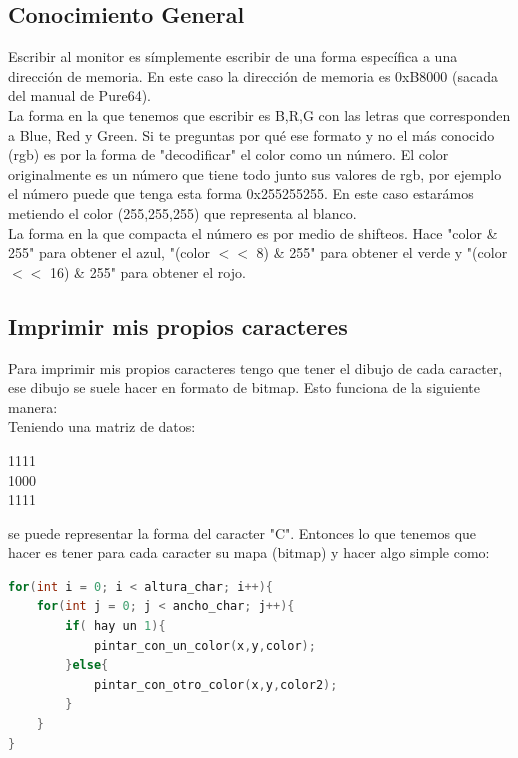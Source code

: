 \documentclass[]{article}
\begin{document}
\subsection*{Conocimiento General}

Escribir al monitor es s\'implemente escribir de una forma espec\'ifica a una direcci\'on de memoria. En este caso la direcci\'on de memoria es 0xB8000 (sacada del manual de Pure64).\\

La forma en la que tenemos que escribir es B,R,G con las letras que corresponden a Blue, Red y Green. Si te preguntas por qu\'e ese formato y no el m\'as conocido (rgb) es por la forma de "decodificar" el color como un n\'umero. El color originalmente es un n\'umero que tiene todo junto sus valores de rgb, por ejemplo el n\'umero puede que tenga esta forma 0x255255255. En este caso estar\'amos metiendo el color (255,255,255) que representa al blanco.\\

La forma en la que compacta el n\'umero es por medio de shifteos. Hace "color \& 255" para obtener el azul, "(color $<<$ 8) \& 255" para obtener el verde y "(color $<<$ 16) \& 255" para obtener el rojo.

\subsection*{Imprimir mis propios caracteres}
Para imprimir mis propios caracteres tengo que tener el dibujo de cada caracter, ese dibujo se suele hacer en formato de bitmap. Esto funciona de la siguiente manera: \\

Teniendo una matriz de datos:\\
\begin{center}
1111\\
1000\\
1111\\
\end{center}

se puede representar la forma del caracter "C". Entonces lo que tenemos que hacer es tener para cada caracter su mapa (bitmap) y hacer algo simple como:\\

\begin{lstlisting}[language=C]
for(int i = 0; i < altura_char; i++){
	for(int j = 0; j < ancho_char; j++){
		if( hay un 1){
			pintar_con_un_color(x,y,color);
		}else{
			pintar_con_otro_color(x,y,color2);
		}
	}
}
\end{lstlisting}
\end{document}
